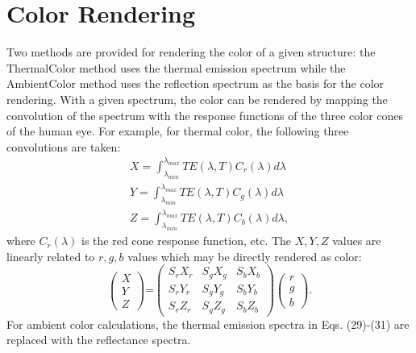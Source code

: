 \documentclass[journal=jpclcd,manuscript=suppinfo]{achemso}
\begin{document}
\section{Color Rendering}
Two methods are provided for rendering the color of a given structure: the ThermalColor method uses the thermal emission spectrum while
the AmbientColor method uses the reflection spectrum as the basis for the color rendering.  
With a given spectrum, the color can be rendered by mapping the convolution of the spectrum with the response functions of 
the three color cones of the human eye.  
For example, for thermal color, the following three convolutions are taken:
\begin{align}
X = \int_{\lambda_{min}}^{\lambda_{max}} TE(\lambda, T) C_r(\lambda) d\lambda \\
Y = \int_{\lambda_{min}}^{\lambda_{max}} TE(\lambda, T) C_g(\lambda) d\lambda \\
Z = \int_{\lambda_{min}}^{\lambda_{max}} TE(\lambda, T) C_b(\lambda) d\lambda,
\end{align} 
where $C_r(\lambda)$ is the red cone response function, etc. 
The $X, Y, Z$ values are linearly related to $r, g, b$ values which may be directly rendered as color:
\begin{equation}
  \begin{pmatrix}
  X \\
  Y \\
  Z
  \end{pmatrix} 
  \mbox{=}
  \begin{pmatrix}
    S_r X_r & S_g X_g & S_b X_b   \\
    S_r Y_r & S_g Y_g & S_b Y_b   \\
    S_r Z_r & S_g Z_g & S_b Z_b
  \end{pmatrix}
  \begin{pmatrix}
  r \\
  g \\
  b
  \end{pmatrix}.
\end{equation}
For ambient color calculations, the thermal emission spectra in Eqs. (29)-(31) are replaced with 
the reflectance spectra.
\end{document}
